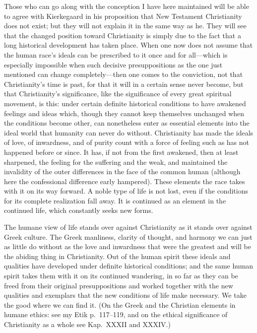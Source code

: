 \documentclass[12pt,a4paper]{book}
\newcommand{\opage}[1]{\marginnote{\footnotesize\textit{[#1]}}}
\begin{document}
Those who can go along with the conception I have here maintained will be
able to agree with Kierkegaard in his proposition that New Testament
Christianity does not exist; but they will not explain it in the same way
as he. They will see that the changed position toward Christianity is
simply due to the fact that a long historical development has taken
place. When one now does not assume that the human race's ideals can be
prescribed to it once and for all---which is especially impossible when
such decisive presuppositions as the one just mentioned can change
completely---then one comes to the conviction, not that Christianity's
time is past, for that it will in a certain sense never become, but that
Christianity's significance, like the significance of every great
spiritual movement, is this: under certain definite historical conditions
to have awakened feelings and ideas which, though they cannot keep
themselves unchanged when the conditions become other, can nonetheless
enter as essential elements into the ideal world that humanity can never
\opage{156}do without. Christianity has made the ideals of love, of
inwardness, and of purity count with a force of feeling such as has not
happened before or since. It has, if not from the first awakened, then at
least sharpened, the feeling for the suffering and the weak, and
maintained the invalidity of the outer differences in the face of the
common human (although here the confessional difference early hampered).
These elements the race takes with it on its way forward. A noble type of
life is not lost, even if the conditions for its complete realization
fall away. It is continued as an element in the continued life, which
constantly seeks new forms.

The humane view of life stands over against Christianity as it stands
over against Greek culture. The Greek manliness, clarity of thought, and
harmony we can just as little do without as the love and inwardness that
were the greatest and will be the abiding thing in Christianity. Out of
the human spirit these ideals and qualities have developed under definite
historical conditions; and the same human spirit takes them with it on
its continued wandering, in so far as they can be freed from their
original presuppositions and worked together with the new qualities and
exemplars that the new conditions of life make necessary. We take the
good where we can find it. (On the Greek and the Christian elements in
humane ethics: see my Etik p.~117--119, and on the ethical significance
of Christianity as a whole see Kap.~XXXII and XXXIV.)
\end{document}
